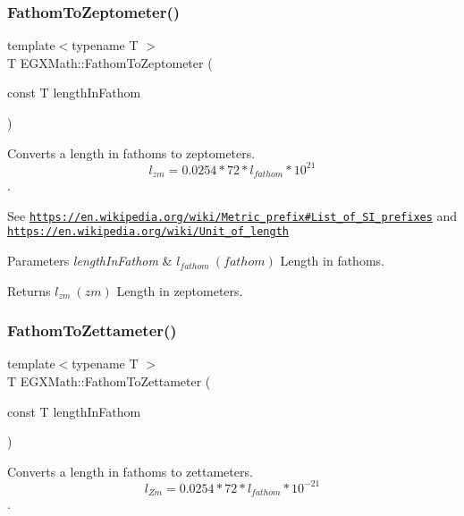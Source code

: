 \subsubsection{\texorpdfstring{Fathom\+To\+Zeptometer()}{FathomToZeptometer()}}
{\footnotesize\ttfamily template$<$typename T $>$ \\
T E\+G\+X\+Math\+::\+Fathom\+To\+Zeptometer (\begin{DoxyParamCaption}\item[{const T}]{length\+In\+Fathom }\end{DoxyParamCaption})}



Converts a length in fathoms to zeptometers. \[ l_{zm}=0.0254 * 72 * l_{fathom} * 10^{21} \]. 

See \href{https://en.wikipedia.org/wiki/Metric_prefix#List_of_SI_prefixes}{\tt https\+://en.\+wikipedia.\+org/wiki/\+Metric\+\_\+prefix\#\+List\+\_\+of\+\_\+\+S\+I\+\_\+prefixes} and \href{https://en.wikipedia.org/wiki/Unit_of_length}{\tt https\+://en.\+wikipedia.\+org/wiki/\+Unit\+\_\+of\+\_\+length} 
\begin{DoxyParams}{Parameters}
{\em length\+In\+Fathom} & $ l_{fathom}\ (fathom)$ Length in fathoms. \\
\hline
\end{DoxyParams}
\begin{DoxyReturn}{Returns}
$ l_{zm}\ (zm)$ Length in zeptometers. 
\end{DoxyReturn}
\mbox{\label{group___e_g_x_math-_conversions-_length_conversions-_nautical-_fathom-_s_i_ga3a5da531076421441774a6c7ac72bcc8}} 
\subsubsection{\texorpdfstring{Fathom\+To\+Zettameter()}{FathomToZettameter()}}
{\footnotesize\ttfamily template$<$typename T $>$ \\
T E\+G\+X\+Math\+::\+Fathom\+To\+Zettameter (\begin{DoxyParamCaption}\item[{const T}]{length\+In\+Fathom }\end{DoxyParamCaption})}



Converts a length in fathoms to zettameters. \[ l_{Zm}=0.0254 * 72 * l_{fathom} * 10^{-21} \]. 

